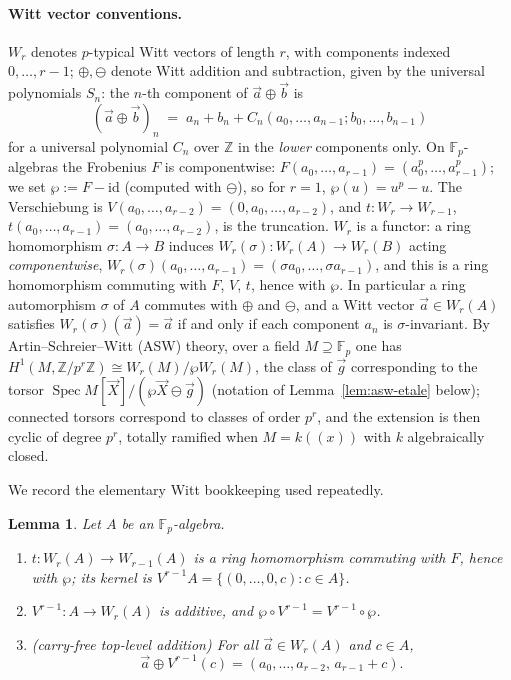 \documentclass[11pt]{article}
\newcommand{\Z}{\mathbb{Z}}
\newcommand{\F}{\mathbb{F}}
\DeclareMathOperator{\Spec}{Spec}
\newcommand{\AS}{\wp}
\newcommand{\va}{\vec a}
\newcommand{\vX}{\vec X}
\theoremstyle{plain}
\newtheorem{lemma}[theorem]{Lemma}
\theoremstyle{definition}
\begin{document}
\paragraph{Witt vector conventions.}
$W_r$ denotes $p$-typical Witt vectors of length $r$, with components indexed
$0,\dots,r-1$; $\oplus,\ominus$ denote Witt addition and subtraction, given by the
universal polynomials $S_n$: the $n$-th component of $\va\oplus\vec b$ is
\begin{equation}\label{eq:addition-shape}
(\va\oplus\vec b)_n \;=\; a_n+b_n+C_n(a_0,\dots,a_{n-1};b_0,\dots,b_{n-1})
\end{equation}
for a universal polynomial $C_n$ over $\Z$ in the \emph{lower} components only.
On $\F_p$-algebras the Frobenius $F$ is componentwise:
$F(a_0,\dots,a_{r-1})=(a_0^p,\dots,a_{r-1}^p)$; we set
$\AS:=F-\mathrm{id}$ (computed with $\ominus$), so for $r=1$, $\AS(u)=u^p-u$.
The Verschiebung is $V(a_0,\dots,a_{r-2})=(0,a_0,\dots,a_{r-2})$, and
$t\colon W_r\to W_{r-1}$, $t(a_0,\dots,a_{r-1})=(a_0,\dots,a_{r-2})$, is the truncation.
$W_r$ is a functor: a ring homomorphism $\sigma\colon A\to B$ induces
$W_r(\sigma)\colon W_r(A)\to W_r(B)$ acting \emph{componentwise},
$W_r(\sigma)(a_0,\dots,a_{r-1})=(\sigma a_0,\dots,\sigma a_{r-1})$, and this is a ring
homomorphism commuting with $F$, $V$, $t$, hence with $\AS$. In particular a ring
automorphism $\sigma$ of $A$ commutes with $\oplus$ and $\ominus$, and a Witt vector
$\va\in W_r(A)$ satisfies $W_r(\sigma)(\va)=\va$ if and only if each component $a_n$ is
$\sigma$-invariant.
By Artin--Schreier--Witt (ASW) theory, over a field $M\supseteq\F_p$ one has
$H^1(M,\Z/p^r\Z)\cong W_r(M)/\AS W_r(M)$, the class of $\vec g$ corresponding to the
torsor $\Spec M[\vX]/(\AS\vX\ominus\vec g)$ (notation of
Lemma~\ref{lem:asw-etale} below); connected torsors correspond to classes of order
$p^r$, and the extension is then cyclic of degree $p^r$, totally ramified when
$M=k((x))$ with $k$ algebraically closed.

We record the elementary Witt bookkeeping used repeatedly.

\begin{lemma}\label{lem:bookkeeping}
Let $A$ be an $\F_p$-algebra.
\begin{enumerate}[label=(\roman*)]
  \item $t\colon W_r(A)\to W_{r-1}(A)$ is a ring homomorphism commuting with $F$, hence
        with $\AS$; its kernel is $V^{r-1}A=\{(0,\dots,0,c):c\in A\}$.
  \item $V^{r-1}\colon A\to W_r(A)$ is additive, and $\AS\circ V^{r-1}=V^{r-1}\circ\AS$.
  \item (carry-free top-level addition) For all $\va\in W_r(A)$ and $c\in A$,
        \[
        \va\oplus V^{r-1}(c)=(a_0,\dots,a_{r-2},\,a_{r-1}+c).
        \]
\end{enumerate}
\end{lemma}
\end{document}
